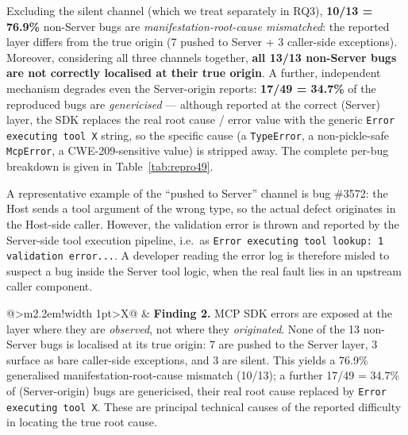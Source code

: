 Excluding the silent channel (which we treat separately in RQ3), \textbf{10/13 = 76.9\%}
non-Server bugs are \emph{manifestation-root-cause mismatched}: the reported layer differs
from the true origin (7 pushed to Server + 3 caller-side exceptions). Moreover, considering
all three channels together, \textbf{all 13/13 non-Server bugs are not correctly localised at
their true origin}. A further, independent mechanism degrades even the Server-origin reports:
\textbf{17/49 = 34.7\%} of the reproduced bugs are \emph{genericised} --- although reported at
the correct (Server) layer, the SDK replaces the real root cause / error value with the generic
\texttt{Error executing tool X} string, so the specific cause (a \texttt{TypeError}, a
non-pickle-safe \texttt{McpError}, a CWE-209-sensitive value) is stripped away. The complete
per-bug breakdown is given in Table~\ref{tab:repro49}.

A representative example of the ``pushed to Server'' channel is bug \#3572: the Host sends a
tool argument of the wrong type, so the actual defect originates in the Host-side caller.
However, the validation error is thrown and reported by the Server-side tool execution pipeline,
i.e.\ as \texttt{Error executing tool lookup: 1 validation error...}. A developer reading the
error log is therefore misled to suspect a bug inside the Server tool logic, when the real fault
lies in an upstream caller component.

\noindent
\begin{tabularx}{\linewidth}{@{}>{\centering\arraybackslash}m{2.2em}!{\vrule width 1pt}>{\arraybackslash}X@{}}
 &
\textbf{Finding 2.} MCP SDK errors are exposed at the layer where they are \emph{observed}, not where they \emph{originated}. None of the 13 non-Server bugs is localised at its true origin: 7 are pushed to the Server layer, 3 surface as bare caller-side exceptions, and 3 are silent. This yields a 76.9\% generalised manifestation-root-cause mismatch (10/13); a further 17/49 = 34.7\% of (Server-origin) bugs are genericised, their real root cause replaced by \texttt{Error executing tool X}. These are principal technical causes of the reported difficulty in locating the true root cause.
\end{tabularx}


